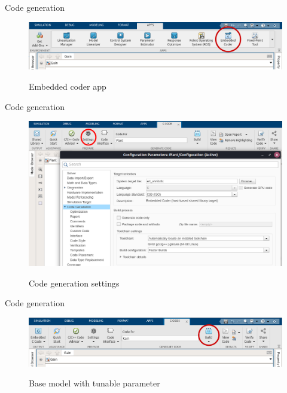 \begin{frame}{Code generation}
	\begin{figure}
		\centering
		\includegraphics[width=\textwidth]{Embedded.png}
		\label{fig:embedded}
		\caption{Embedded coder app}
	\end{figure}
\end{frame}

\begin{frame}{Code generation}
	\begin{figure}
		\centering
		\includegraphics[scale=0.3]{Settings.png}
		\label{fig:settingd}
		\caption{Code generation settings}
	\end{figure}
\end{frame}

\begin{frame}{Code generation}
	\begin{figure}
		\centering
		\includegraphics[width=\textwidth]{Build.png}
		\label{fig:build}
		\caption{Base model with tunable parameter}
	\end{figure}
\end{frame}

